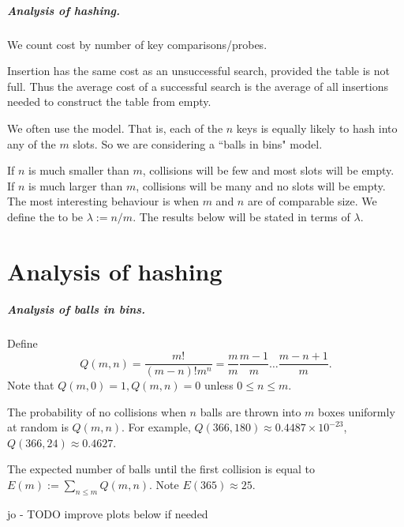 \paragraph{Analysis of hashing.}

We count cost by number of key comparisons/probes.

Insertion has the same cost as an unsuccessful search, provided the table 
is not full. Thus the average cost of a successful search is the average of all insertions
 needed to construct the table from empty.

We often use the  model. That is, each of 
the $n$ keys is equally likely to hash into any of the $m$ slots. So we are 
considering a ``balls in bins" model.

If $n$ is much smaller than $m$, collisions will be few and most slots 
will be empty. If $n$ is much larger than $m$, collisions will be many and no 
slots will be empty. The most interesting behaviour is when $m$ and $n$ are 
of comparable size. We define the  to be $\lambda := n/m$. The results below 
will be stated in terms of $\lambda$.


\chapter{Analysis of hashing} %

\paragraph{Analysis of balls in bins.}
Define 
$$Q(m, n) = \frac{m!}{(m-n)! m^n} = \frac{m}{m} \frac{m-1}{m} \dots 
\frac{m - n + 1}{m}.$$
Note that $Q(m,0) = 1, Q(m, n) = 0$ unless $0 \leq n \leq m$.

The probability of no collisions when $n$ balls are thrown into $m$ boxes 
uniformly at random is $Q(m, n)$. For example, $Q(366, 180) \approx 0.4487
 \times 10^{-23}$, $Q(366, 24) \approx  0.4627$. 

The expected number of balls until the first collision is equal to 
$E(m):=\sum_{n \leq m} Q(m, n)$. Note $E(365) \approx 25$.

jo - TODO improve plots below if needed


